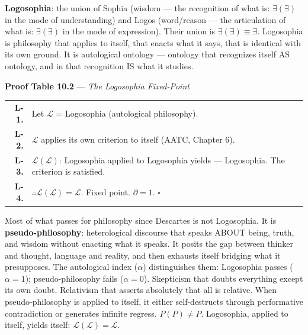 \documentclass[10pt, openany, oneside]{book}
\renewcommand{\footnotesize}{\fontsize{8.5}{11}\selectfont}
\begin{document}
\textbf{Logosophia}: the union of Sophia (wisdom --- the recognition of what is: $\exists(\exists)$ in the mode of understanding) and Logos (word/reason --- the articulation of what is: $\exists(\exists)$ in the mode of expression). Their union is $\exists(\exists) \equiv \exists$. Logosophia is philosophy that applies to itself, that enacts what it says, that is identical with its own ground. It is autological ontology --- ontology that recognizes itself AS ontology, and in that recognition IS what it studies.

\vspace{0.5em}

\textbf{Proof Table 10.2} --- \textit{The Logosophia Fixed-Point}

\vspace{0.5em}

{\footnotesize
\noindent\begin{tabular}{r p{}}
\textbf{L-1.} & Let $\mathcal{L}$ = Logosophia (autological philosophy). \\[0.3em]
\textbf{L-2.} & $\mathcal{L}$ applies its own criterion to itself (AATC, Chapter 6). \\[0.3em]
\textbf{L-3.} & $\mathcal{L}(\mathcal{L})$: Logosophia applied to Logosophia yields --- Logosophia. The criterion is satisfied. \\[0.3em]
\textbf{L-4.} & $\therefore \mathcal{L}(\mathcal{L}) = \mathcal{L}$. Fixed point. $\partial = 1$. $\square$ \\[0.3em]
\end{tabular}
}

\vspace{0.8em}

\noindent Most of what passes for philosophy since Descartes is not Logosophia. It is \textbf{pseudo-philosophy}: heterological discourse that speaks ABOUT being, truth, and wisdom without enacting what it speaks. It posits the gap between thinker and thought, language and reality, and then exhausts itself bridging what it presupposes. The autological index ($\alpha$) distinguishes them: Logosophia passes ($\alpha = 1$); pseudo-philosophy fails ($\alpha = 0$). Skepticism that doubts everything except its own doubt. Relativism that asserts absolutely that all is relative. When pseudo-philosophy is applied to itself, it either self-destructs through performative contradiction or generates infinite regress. $P(P) \neq P$. Logosophia, applied to itself, yields itself: $\mathcal{L}(\mathcal{L}) = \mathcal{L}$.
\end{document}
